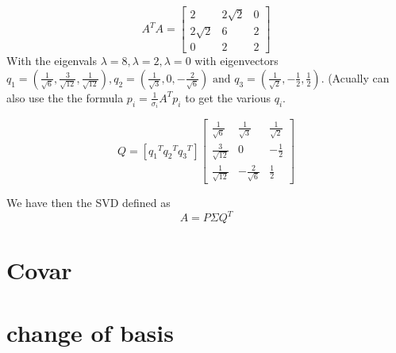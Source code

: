 \documentclass[12pt,a4paper]{article}
\begin{document}
$$
A^{T} A=\left[\begin{array}{ccc}{2} & {2 \sqrt{2}} & {0} \\ {2 \sqrt{2}} & {6} & {2} \\ {0} & {2} & {2}\end{array}\right]
$$
With the eigenvals $\lambda=8, \lambda=2, \lambda=0$ with eigenvectors
$q_{1}=\left(\frac{1}{\sqrt{6}}, \frac{3}{\sqrt{12}}, \frac{1}{\sqrt{12}}\right), q_{2}=\left(\frac{1}{\sqrt{3}}, 0,-\frac{2}{\sqrt{6}}\right) \text { and } q_{3}=\left(\frac{1}{\sqrt{2}},-\frac{1}{2}, \frac{1}{2}\right)$. (Acually
 can also use the the formula $p_{i}=\frac{1}{\sigma_{i}} A^{T} p_{i}$ to get the various $q_i$.


$$
Q=\left[  {q_1}^T {q_2}^T {q_3}^T     \right]
\left[\begin{array}{ccc}{\frac{1}{\sqrt{6}}} & {\frac{1}{\sqrt{3}}} & {\frac{1}{\sqrt{2}}} \\ {\frac{3}{\sqrt{12}}} & {0} & {-\frac{1}{2}} \\ {\frac{1}{\sqrt{12}}} & {-\frac{2}{\sqrt{6}}} & {\frac{1}{2}}\end{array}\right]
$$


We have then the SVD defined as
$$
A=P \Sigma Q^{T}
$$

\section{Covar}
\label{sec-4}


\newpage

\section{change of basis}
\label{sec-5}
\end{document}
